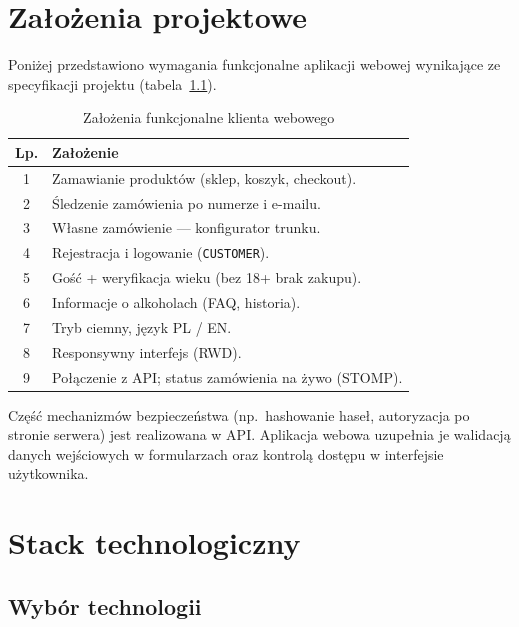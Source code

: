 \documentclass[12pt,a4paper]{report}
\newcommand{\blok}[1]{\needspace{9\baselineskip}#1}
\newcommand{\tabela}[1]{\needspace{11\baselineskip}#1}
\begin{document}
\chapter{Założenia projektowe}

\blok{%
Poniżej przedstawiono wymagania funkcjonalne aplikacji webowej wynikające ze specyfikacji projektu (tabela~\ref{tab:zalozenia}).
}

\tabela{%
\begin{table}[H]
  \centering
  \caption{Założenia funkcjonalne klienta webowego}
  \label{tab:zalozenia}
  \begin{tabular}{@{}cl@{}}
    \toprule
    \textbf{Lp.} & \textbf{Założenie} \\
    \midrule
    1 & Zamawianie produktów (sklep, koszyk, checkout). \\
    2 & Śledzenie zamówienia po numerze i e-mailu. \\
    3 & Własne zamówienie --- konfigurator trunku. \\
    4 & Rejestracja i logowanie (\texttt{CUSTOMER}). \\
    5 & Gość + weryfikacja wieku (bez 18+ brak zakupu). \\
    6 & Informacje o alkoholach (FAQ, historia). \\
    7 & Tryb ciemny, język PL / EN. \\
    8 & Responsywny interfejs (RWD). \\
    9 & Połączenie z API; status zamówienia na żywo (STOMP). \\
    \bottomrule
  \end{tabular}
\end{table}
}

Część mechanizmów bezpieczeństwa (np.\ hashowanie haseł, autoryzacja po stronie serwera) jest realizowana w API. Aplikacja webowa uzupełnia je walidacją danych wejściowych w formularzach oraz kontrolą dostępu w interfejsie użytkownika.

\chapter{Stack technologiczny}

\section{Wybór technologii}
\end{document}

